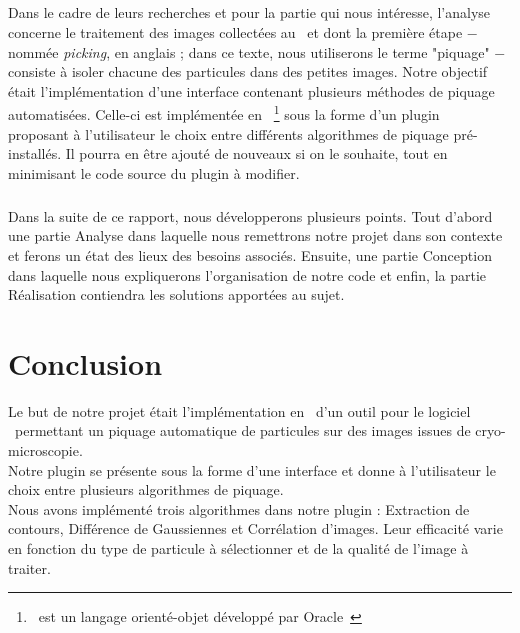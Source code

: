 \documentclass[12pt,a4paper]{report}
\begin{document}
\paragraph*{}
Dans le cadre de leurs recherches et pour la partie qui nous intéresse, l'analyse concerne le traitement des images collectées au \me ~et dont la première étape $-$ nommée \textit{picking}, en anglais ; dans ce texte, nous utiliserons le terme "piquage" $-$ consiste à isoler chacune des particules dans des petites images.  %
Notre objectif était l'implémentation d'une interface contenant plusieurs méthodes de piquage automatisées.
Celle-ci est implémentée en \java ~\footnote{\java\ est un langage orienté-objet développé par Oracle~\cite{java:url}} sous la forme d'un plugin \imj ~\cite{imagej:url} proposant à l'utilisateur le choix entre différents algorithmes de piquage pré-installés. Il pourra en \^etre ajouté de nouveaux si on le souhaite, tout en minimisant le code source du plugin à modifier.  

\paragraph*{}
Dans la suite de ce rapport, nous développerons plusieurs points. Tout d'abord une partie Analyse dans laquelle nous remettrons notre projet dans son contexte et ferons un état des lieux des besoins associés. Ensuite, une partie Conception dans laquelle nous expliquerons l'organisation de notre code et enfin, la partie Réalisation contiendra les solutions apportées au sujet.







\chapter*{Conclusion}


Le but de notre projet était l'implémentation en \java ~d'un outil pour le logiciel \imj ~permettant un piquage automatique de particules sur des images issues de cryo-microscopie. \\
Notre plugin se présente sous la forme d'une interface et donne à l'utilisateur le choix entre plusieurs algorithmes de piquage. \\
Nous avons implémenté trois algorithmes dans notre plugin : Extraction de contours, Différence de Gaussiennes et Corrélation d'images. Leur efficacité varie en fonction du type de particule à sélectionner et de la qualité de l'image à traiter. \\
\end{document}
